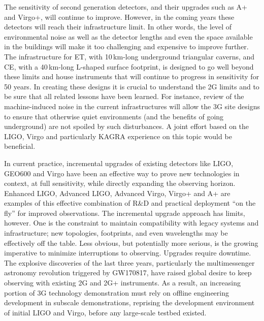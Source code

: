 The sensitivity of second generation detectors, and their upgrades such as A+ and Virgo+, will continue to improve. 
However, in the coming years these detectors will reach their infrastructure limit. In other words, the level of environmental noise as well as the detector lengths and even the space available in the buildings will make it too challenging and expensive to improve further. The infrastructure for ET, with 10\,km-long underground triangular caverns, and CE, with a 40\,km-long L-shaped surface footprint, is designed to go well beyond these limits and house instruments that will continue to progress in sensitivity for 50 years.   
In creating these designs it is crucial to understand the 2G limits and to be sure that all related lessons have been learned. For instance, review of the machine-induced noise in the current infrastructures will allow the 3G site designs to ensure that otherwise quiet environments (and the benefits of going underground) are not spoiled by such disturbances. A joint effort based on the LIGO, Virgo and particularly KAGRA experience on this topic would be beneficial. 

In current practice, incremental upgrades of existing detectors like LIGO, GEO600  and Virgo have been an effective way to prove new technologies in context, at full sensitivity, while directly expanding the observing horizon. Enhanced LIGO, Advanced LIGO, Advanced Virgo, Virgo+ and A+ are examples of this effective combination of R\&D and practical deployment ``on the fly''  for improved observations.  
The incremental upgrade approach has limits, however.  One is the constraint to maintain compatibility with legacy systems and infrastructure; new topologies, footprints, and even wavelengths may be effectively off the table. Less obvious, but potentially more serious, is the growing imperative to minimize interruptions to observing. Upgrades require downtime.  The explosive discoveries of the last three years, particularly the multimessenger astronomy revolution triggered by GW170817,  have raised global desire to keep observing with existing 2G and 2G+ instruments. 
As a result, an increasing portion of 3G technology demonstration must rely on offline engineering development in subscale demonstrations, reprising the development environment of initial LIGO and Virgo, before any large-scale testbed existed. 

